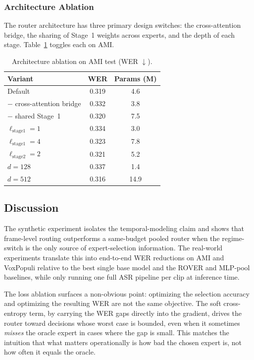 \documentclass[journal]{IEEEtran}
\begin{document}
\subsubsection{Architecture Ablation}

The router architecture has three primary design switches: the
cross-attention bridge, the sharing of Stage~1 weights across
experts, and the depth of each stage. Table~\ref{tab:arch_ablation}
toggles each on AMI.

\begin{table}[t]
\centering
\caption{Architecture ablation on AMI test (WER $\downarrow$).}
\label{tab:arch_ablation}
\small
\begin{tabular}{lcc}
\toprule
Variant & WER & Params (M) \\
\midrule
Default %
                                    & 0.319 & 4.6 \\
$-$ cross-attention bridge          & 0.332 & 3.8 \\
$-$ shared Stage~1 %
                                    & 0.320 & 7.5 \\
$\ell_{\text{stage1}}=1$            & 0.334 & 3.0 \\
$\ell_{\text{stage1}}=4$            & 0.323 & 7.8 \\
$\ell_{\text{stage2}}=2$            & 0.321 & 5.2 \\
$d=128$                             & 0.337 & 1.4 \\
$d=512$                             & 0.316 & 14.9 \\
\bottomrule
\end{tabular}
\end{table}

\subsection{Discussion}
\label{subsec:discussion}

The synthetic experiment isolates the temporal-modeling claim and
shows that frame-level routing outperforms a same-budget pooled
router when the regime-switch is the only source of expert-selection
information. The real-world experiments translate this into
end-to-end WER reductions on AMI and VoxPopuli relative to the best
single base model and the ROVER and MLP-pool baselines, while only
running one full ASR pipeline per clip at inference time.

The loss ablation surfaces a non-obvious point: optimizing the
selection accuracy and optimizing the resulting WER are not the
same objective. The soft cross-entropy term, by carrying the WER
gaps directly into the gradient, drives the router toward decisions
whose worst case is bounded, even when it sometimes \emph{misses}
the oracle expert in cases where the gap is small. This matches the
intuition that what matters operationally is how bad the chosen
expert is, not how often it equals the oracle.
\end{document}
